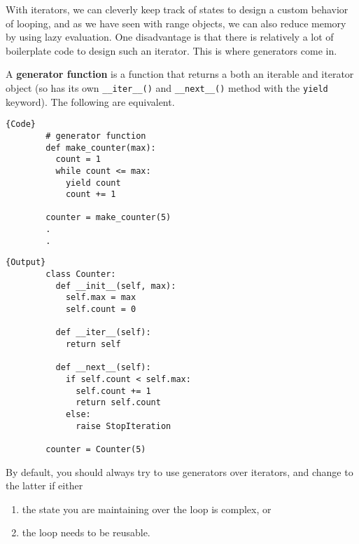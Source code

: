   With iterators, we can cleverly keep track of states to design a custom behavior of looping, and as we have seen with range objects, we can also reduce memory by using lazy evaluation. One disadvantage is that there is relatively a lot of boilerplate code to design such an iterator. This is where generators come in. 

  \begin{definition}[Generator]
    A \textbf{generator function} is a function that returns a both an iterable and iterator object (so has its own \texttt{\_\_iter\_\_()} and \texttt{\_\_next\_\_()} method with the \texttt{yield} keyword). The following are equivalent. 

    \noindent\begin{minipage}{.5\textwidth}
      \begin{lstlisting}[]{Code}
        # generator function
        def make_counter(max):
          count = 1
          while count <= max:
            yield count
            count += 1

        counter = make_counter(5) 
        .
        .
      \end{lstlisting}
      \end{minipage}
      \hfill
      \begin{minipage}{.49\textwidth}
      \begin{lstlisting}[]{Output}
        class Counter: 
          def __init__(self, max): 
            self.max = max
            self.count = 0

          def __iter__(self): 
            return self

          def __next__(self): 
            if self.count < self.max: 
              self.count += 1 
              return self.count 
            else: 
              raise StopIteration

        counter = Counter(5) 
      \end{lstlisting}
    \end{minipage}
  \end{definition} 

  By default, you should always try to use generators over iterators, and change to the latter if either 
  \begin{enumerate}
    \item the state you are maintaining over the loop is complex, or 
    \item the loop needs to be reusable.  
  \end{enumerate}
